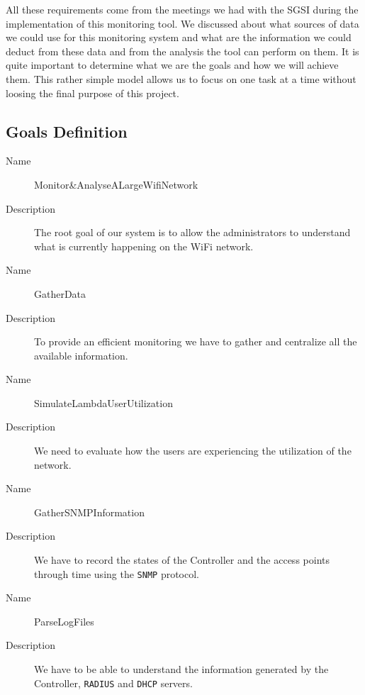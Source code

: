 All these requirements come from the meetings we had with the SGSI during the implementation of this monitoring tool. We discussed about what sources of data we could use for this monitoring system and what are the information we could deduct from these data and from the analysis the tool can perform on them. It is quite important to determine what we are the goals and how we will achieve them. This rather simple model allows us to focus on one task at a time without loosing the final purpose of this project.

\subsection{Goals Definition}
\begin{description}
  \item[Name] Monitor\&AnalyseALargeWifiNetwork
  \item[Description] The root goal of our system is to allow the administrators to understand what is currently happening on the WiFi network.
\end{description}

\begin{description}
  \item[Name] GatherData
  \item[Description] To provide an efficient monitoring we have to gather and centralize all the available information. 
\end{description}

\begin{description}
  \item[Name] SimulateLambdaUserUtilization
  \item[Description] We need to evaluate how the users are experiencing the utilization of the network.
\end{description}

\begin{description}
  \item[Name] GatherSNMPInformation
  \item[Description] We have to record the states of the Controller and the access points through time using the \texttt{SNMP} protocol.
\end{description}

\begin{description}
  \item[Name] ParseLogFiles
  \item[Description] We have to be able to understand the information generated by the Controller, \texttt{RADIUS} and \texttt{DHCP} servers.
\end{description}

